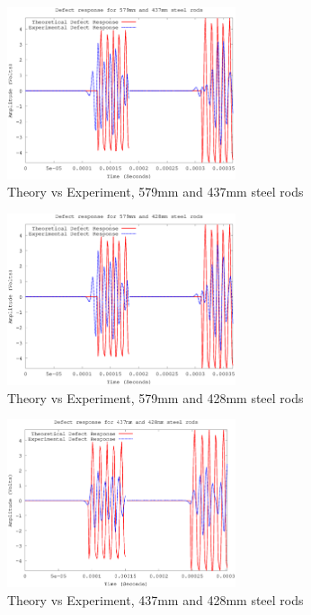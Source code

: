 \begin{figure}[ht!]
\centering
\includegraphics[width=0.6\textwidth]{eps_pics/steel-1-2_Iter_th_exp.eps}
\caption{Theory vs Experiment, 579mm and 437mm steel rods
	 \label{fig:steelThExp1}} 
\end{figure}

\begin{figure}[ht!]
\centering
\includegraphics[width=0.6\textwidth]{eps_pics/steel-1-3_Iter_th_exp.eps}
\caption{Theory vs Experiment, 579mm and 428mm steel rods
	 \label{fig:steelThExp2}} 
\end{figure}

\begin{figure}[ht!]
\centering
\includegraphics[width=0.6\textwidth]{eps_pics/steel-2-3_Iter_th_exp.eps}
\caption{Theory vs Experiment, 437mm and 428mm steel rods
	 \label{fig:steelThExp3}} 
\end{figure}

